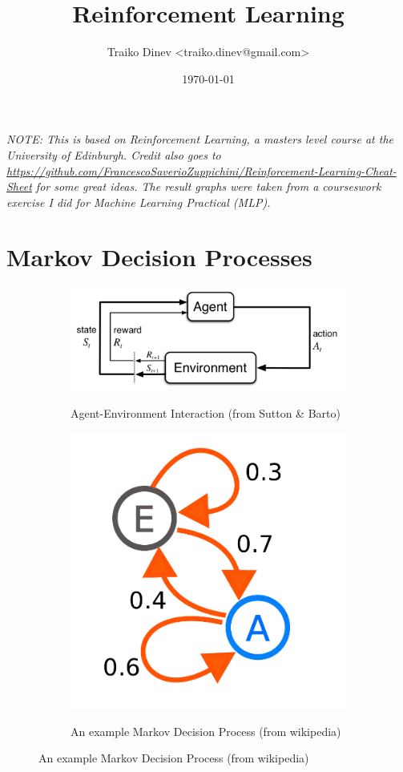 \documentclass{article}
\title{Reinforcement Learning}
\date{\today}
\author{Traiko Dinev \textless traiko.dinev@gmail.com\textgreater}
\begin{document}
\maketitle
\textit{NOTE: This is based on Reinforcement Learning, a masters level course at the University of Edinburgh. Credit also goes to \url{https://github.com/FrancescoSaverioZuppichini/Reinforcement-Learning-Cheat-Sheet} for some great ideas. The result graphs were taken from a courseswork exercise I did for Machine Learning Practical (MLP).}

\section{Markov Decision Processes}
\begin{figure}[ht]
    \centering
    \begin{subfigure}{0.4\textwidth}
        \centering
        \includegraphics[width=\textwidth]{figures/agent_environment.png}
        \label{fig:agent_environment}
        \caption{Agent-Environment Interaction (from Sutton \& Barto)}
    \end{subfigure}
    \centering
    \begin{subfigure}{0.25\textwidth}
        \centering
        \includegraphics[width=\textwidth]{figures/Markovkate_01.png}
        \label{fig:mdp}
        \caption{An example Markov Decision Process (from wikipedia)}
    \end{subfigure}
\end{figure}
\end{document}
